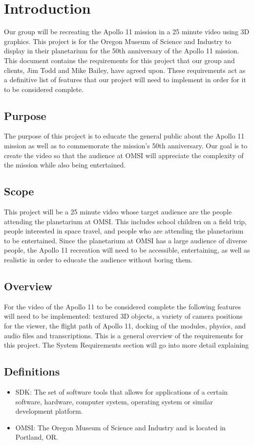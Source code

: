 \documentclass[onecolumn, draftclsnofoot,10pt, compsoc]{IEEEtran}
\begin{document}
\section{Introduction}
Our group will be recreating the Apollo 11 mission in a 25 minute video using 3D graphics. This project is for the Oregon Museum of Science and Industry to display in their planetarium for the 50th anniversary of the Apollo 11 mission. This document contains the requirements for this project that our group and clients, Jim Todd and Mike Bailey, have agreed upon. These requirements act as a definitive list of features that our project will need to implement in order for it to be considered complete. 
    \subsection{Purpose}
    The purpose of this project is to educate the general public about the Apollo 11 mission as well as to commemorate the mission's 50th anniversary. Our goal is to create the video so that the audience at OMSI will appreciate the complexity of the mission while also being entertained. 
    \subsection{Scope}
    This project will be a 25 minute video whose target audience are the people attending the planetarium at OMSI. This includes school children on a field trip, people interested in space travel, and people who are attending the planetarium to be entertained. Since the planetarium at OMSI has a large audience of diverse people, the Apollo 11 recreation will need to be accessible, entertaining, as well as realistic in order to educate the audience without boring them.
    \subsection{Overview}
    For the video of the Apollo 11 to be considered complete the following features will need to be implemented: textured 3D objects, a variety of camera positions for the viewer, the flight path of Apollo 11, docking of the modules, physics, and audio files and transcriptions. This is a general overview of the requirements for this project. The System Requirements section will go into more detail explaining  
    \subsection{Definitions}
    \begin{itemize}
        \item SDK: The set of software tools that allows for applications of a certain software, hardware, computer system, operating system or similar development platform.
        \item OMSI: The Oregon Museum of Science and Industry and is located in Portland, OR.
    \end{itemize}
\end{document}
